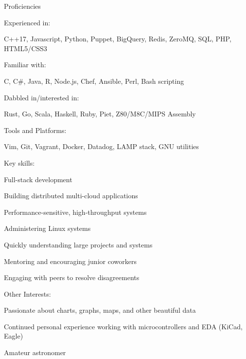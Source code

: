 \documentclass[letterpaper,12pt]{article}
\begin{document}
\begin{paracol}{2}
\vspace{2em}
\begin{rsection}{Proficiencies}
  \begin{rpara}{Experienced in:}%
    \raggedright
    C++17, Javascript, Python, Puppet, BigQuery, Redis, ZeroMQ, SQL, PHP, HTML5/CSS3
  \end{rpara}
  \begin{rpara}{Familiar with:}%
    \raggedright
    C, C\#, Java, R, Node.js, Chef, Ansible, Perl, Bash scripting
  \end{rpara}
  \begin{rpara}{Dabbled in/interested in:}%
    \raggedright
    Rust, Go, Scala, Haskell, Ruby, Piet, Z80/M8C/MIPS Assembly
  \end{rpara}

  \begin{rpara}{Tools and Platforms:}%
    \raggedright
    Vim, Git, Vagrant, Docker, Datadog, LAMP stack, GNU utilities
  \end{rpara}
  \newpage
  \begin{rsubitems}[
    leftmargin=1.5em,
    itemindent=0em,
    labelwidth=1.5em
  ]{Key skills:}
    \item Full-stack development
    \item Building distributed multi-cloud applications
    \item Performance-sensitive, high-throughput systems
    \item Administering Linux systems
    \item Quickly understanding large projects and systems
    \item Mentoring and encouraging junior coworkers
    \item Engaging with peers to resolve disagreements
  \end{rsubitems}
  \begin{rsubitems}[
    leftmargin=1.5em,
    itemindent=0em,
    labelwidth=1.5em
  ]{Other Interests:}
    \item Passionate about charts, graphs, maps, and other beautiful data\\
    \item Continued personal experience working with microcontrollers and EDA (KiCad, Eagle)
    \item Amateur astronomer
  \end{rsubitems}
\end{rsection}


\end{paracol}
\end{document}
